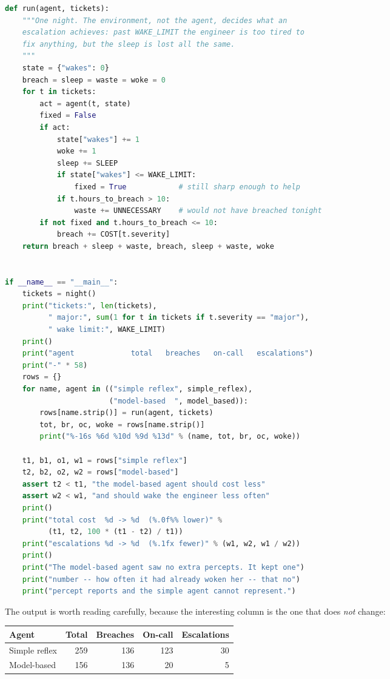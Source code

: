 \begin{lab}
\begin{lstlisting}[language=Python]
def run(agent, tickets):
    """One night. The environment, not the agent, decides what an
    escalation achieves: past WAKE_LIMIT the engineer is too tired to
    fix anything, but the sleep is lost all the same.
    """
    state = {"wakes": 0}
    breach = sleep = waste = woke = 0
    for t in tickets:
        act = agent(t, state)
        fixed = False
        if act:
            state["wakes"] += 1
            woke += 1
            sleep += SLEEP
            if state["wakes"] <= WAKE_LIMIT:
                fixed = True            # still sharp enough to help
            if t.hours_to_breach > 10:
                waste += UNNECESSARY    # would not have breached tonight
        if not fixed and t.hours_to_breach <= 10:
            breach += COST[t.severity]
    return breach + sleep + waste, breach, sleep + waste, woke


if __name__ == "__main__":
    tickets = night()
    print("tickets:", len(tickets),
          " major:", sum(1 for t in tickets if t.severity == "major"),
          " wake limit:", WAKE_LIMIT)
    print()
    print("agent             total   breaches   on-call   escalations")
    print("-" * 58)
    rows = {}
    for name, agent in (("simple reflex", simple_reflex),
                        ("model-based  ", model_based)):
        rows[name.strip()] = run(agent, tickets)
        tot, br, oc, woke = rows[name.strip()]
        print("%-16s %6d %10d %9d %13d" % (name, tot, br, oc, woke))

    t1, b1, o1, w1 = rows["simple reflex"]
    t2, b2, o2, w2 = rows["model-based"]
    assert t2 < t1, "the model-based agent should cost less"
    assert w2 < w1, "and should wake the engineer less often"
    print()
    print("total cost  %d -> %d  (%.0f%% lower)" %
          (t1, t2, 100 * (t1 - t2) / t1))
    print("escalations %d -> %d  (%.1fx fewer)" % (w1, w2, w1 / w2))
    print()
    print("The model-based agent saw no extra percepts. It kept one")
    print("number -- how often it had already woken her -- that no")
    print("percept reports and the simple agent cannot represent.")
\end{lstlisting}
The output is worth reading carefully, because the interesting column is the one
that does \emph{not} change:

\smallskip
\noindent\begin{tabular}{@{}L{3.4cm}rrrr@{}}
\toprule
\textbf{Agent} & \textbf{Total} & \textbf{Breaches} & \textbf{On-call} &
\textbf{Escalations} \\
\midrule
Simple reflex & 259 & 136 & 123 & 30 \\
Model-based   & 156 & 136 &  20 &  5 \\
\bottomrule
\end{tabular}


\end{lab}
